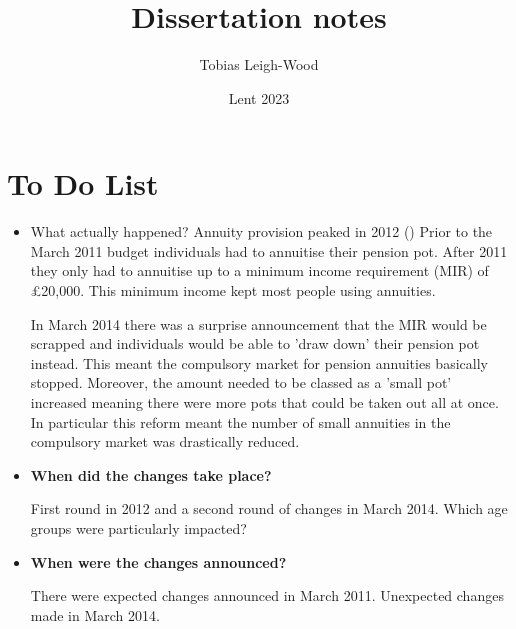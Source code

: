 \documentclass[12pt]{article}
\date{Lent 2023}
\title{Dissertation notes}
\author{Tobias Leigh-Wood}
\begin{document}
\maketitle

\section*{To Do List}
\begin{itemize}
    \item What actually happened?
          Annuity provision peaked in 2012 (\cite{cannon_effect_2016}) Prior to the March 2011 budget individuals had to annuitise their pension pot.
          After 2011 they only had to annuitise up to a minimum income requirement (MIR) of £20,000. This minimum income kept most people using annuities.

          In March 2014 there was a surprise announcement that the MIR would be scrapped and individuals would be able to 'draw down' their pension pot instead.
          This meant the compulsory market for pension annuities basically stopped. Moreover, the amount needed to be classed as a 'small pot' increased meaning there were more pots that could be taken out all at once.
          In particular this reform meant the number of small annuities in the compulsory market was drastically reduced.


    \item \textbf{When did the changes take place?}

          First round in 2012 and a second round of changes in March 2014. Which age groups were particularly impacted?

    \item \textbf{When were the changes announced?}

          There were expected changes announced in March 2011. Unexpected changes made in March 2014.
\end{itemize}




\end{document}
